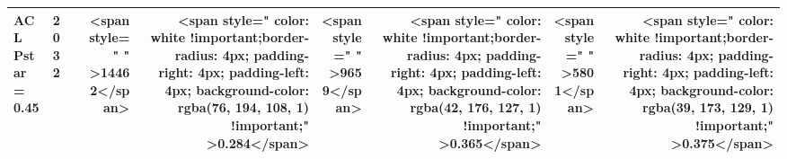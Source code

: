 \begin{table}
\begin{tabular}[t]{>{}l|l>{}rr>{}r|rrrr}
\multirow{-12}{*}{\raggedright\arraybackslash \textbf{ACL Pstar = 0.45}} & 2032 & \cellcolor[HTML]{53596C}{\textcolor{white}{790}} & <span style="     " >14462</span> & <span style="     color: white !important;border-radius: 4px; padding-right: 4px; padding-left: 4px; background-color: rgba(76, 194, 108, 1) !important;" >0.284</span> & <span style="     " >9659</span> & <span style="     color: white !important;border-radius: 4px; padding-right: 4px; padding-left: 4px; background-color: rgba(42, 176, 127, 1) !important;" >0.365</span> & <span style="     " >5801</span> & <span style="     color: white !important;border-radius: 4px; padding-right: 4px; padding-left: 4px; background-color: rgba(39, 173, 129, 1) !important;" >0.375</span>\\
\bottomrule
\end{tabular}
\end{table}
